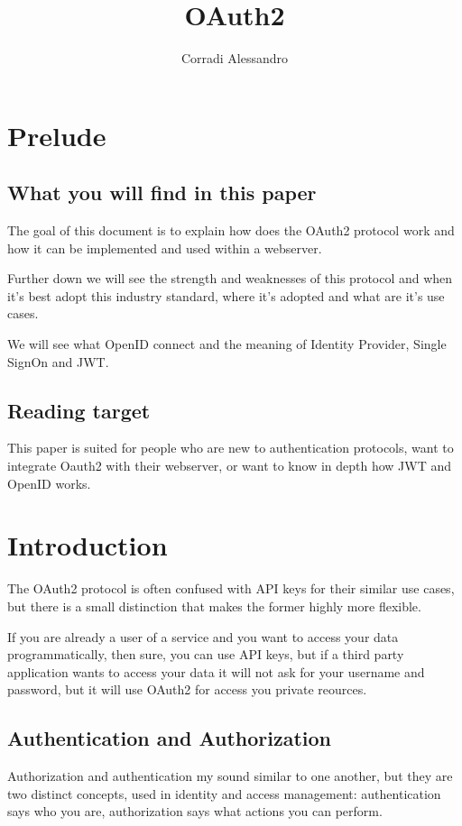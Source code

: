 \documentclass[20pt]{style}
\title{OAuth2}
\author{Corradi Alessandro}
\begin{document}
\maketitle{}
\tableofcontents
\clearpage
{}


\section{Prelude}
\subsection{What you will find in this paper}
The goal of this document is to explain how does the OAuth2 protocol work and
how it can be implemented and used within a webserver.

Further down we will see the strength and weaknesses of this protocol and when
it's best adopt this industry standard, where it's adopted and what are it's use
cases.

We will see what OpenID connect and the meaning of Identity Provider, Single SignOn
and JWT.
\subsection{Reading target}
This paper is suited for people who are new to authentication protocols, want to
integrate Oauth2 with their webserver, or want to know in depth how JWT and
OpenID works.

\section{Introduction}
The OAuth2 protocol is often confused with API keys for their similar use cases,
but there is a small distinction that makes the former highly more flexible.

If you are already a user of a service and you want to access your data
programmatically, then sure, you can use API keys, but if a third party
application wants to access your data it will not ask for your username and
password, but it will use OAuth2 for access you private reources.

\subsection{Authentication and Authorization}
Authorization and authentication my sound similar to one another, but they are
two distinct concepts, used in identity and access management:
authentication says who you are, authorization says what actions you can
perform.
\end{document}
